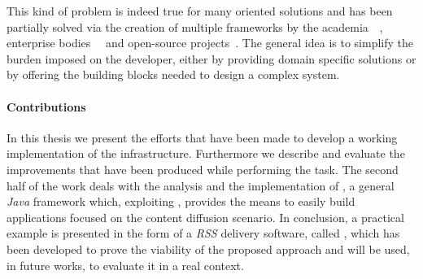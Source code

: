 This kind of problem is indeed true for many \ptop oriented solutions
and has been partially solved via the creation of multiple frameworks
by the academia~\cite{AntHill}~\cite{P2PFramework},
enterprise bodies~\cite{JXTA}~\cite{dotNETp2p} and open-source
projects~\cite{GNUnet}. The general idea is to simplify the burden
imposed on the developer, either by providing domain specific solutions
or by offering the building blocks needed to design a complex system.

\paragraph{Contributions} In this thesis we present the efforts that
have been made to develop a working implementation of the \cloudcast
infrastructure. Furthermore we describe and evaluate the improvements
that have been produced while performing the task. The second half of
the work deals with the analysis and the implementation of
\cloudypeer, a general \textit{Java} framework which, exploiting \cloudcast,
provides the means to easily build applications focused on the content
diffusion scenario. In conclusion, a practical example is presented in
the form of a \textit{RSS} delivery software, called \cloudyrss, which
has been developed to prove the viability of the proposed approach and
will be used, in future works, to evaluate it in a real context.
